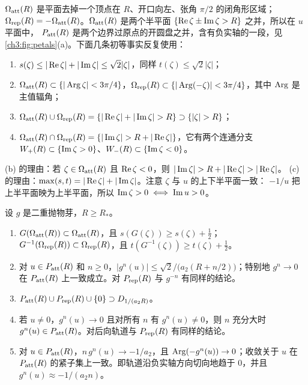 $\Omega_{\mathrm{att}}(R)$ 是平面去掉一个顶点在 $R$、开口向左、张角 $\pi/2$ 的闭角形区域；
$\Omega_{\mathrm{rep}}(R)=-\Omega_{\mathrm{att}}(R)$。$\Omega_{\mathrm{att}}(R)$ 是两个半平面 $\{\operatorname{Re}\zeta\pm\operatorname{Im}\zeta>R\}$ 之并，所以在 $u$ 平面中，
$P_{\mathrm{att}}(R)$ 是两个边界过原点的开圆盘之并，含有负实轴的一段，见\cref{ch3:fig:petals}(a)。下面几条初等事实反复使用：
\begin{enumerate}[label=(\alph*)]
\item $s(\zeta)\le|\operatorname{Re}\zeta|+|\operatorname{Im}\zeta|\le\sqrt2|\zeta|$，同样 $t(\zeta)\le\sqrt2|\zeta|$；
\item $\Omega_{\mathrm{att}}(R)\subset\{|\operatorname{Arg}\zeta|<3\pi/4\}$，$\Omega_{\mathrm{rep}}(R)\subset\{|\operatorname{Arg}(-\zeta)|<3\pi/4\}$，其中 $\operatorname{Arg}$ 是主值辐角；
\item $\Oatt(R)\cup\Orep(R)=\{|\Rea\zeta|+|\Ima\zeta|>R\}\supset\{|\zeta|>R\}$；
\item $\Oatt(R)\cap\Orep(R)=\{|\Ima\zeta|>R+|\Rea\zeta|\}$，它有两个连通分支 $W_+(R)\subset\{\operatorname{Im}\zeta>0\}$、$W_-(R)\subset\{\operatorname{Im}\zeta<0\}$。
\end{enumerate}
(b) 的理由：若 $\zeta\in\Omega_{\mathrm{att}}(R)$ 且 $\operatorname{Re}\zeta<0$，则 $|\Ima\zeta|>R+|\Rea\zeta|>|\Rea\zeta|$。
(c) 的理由：$\max(s,t)=|\operatorname{Re}\zeta|+|\operatorname{Im}\zeta|$。注意 $\zeta$ 与 $u$ 的上下半平面一致：
$-1/u$ 把上半平面映为上半平面，所以 $\operatorname{Im}\zeta>0\iff\operatorname{Im} u>0$。

\begin{theorem}\label{ch3:thm:flower}
设 $g$ 是二重抛物芽，$R\ge R_*$。
\begin{enumerate}
\item $G(\Omega_{\mathrm{att}}(R))\subset\Omega_{\mathrm{att}}(R)$，且 $s(G(\zeta))\ge s(\zeta)+\tfrac12$；
 $G^{-1}(\Omega_{\mathrm{rep}}(R))\subset\Omega_{\mathrm{rep}}(R)$，且 $t(G^{-1}(\zeta))\ge t(\zeta)+\tfrac12$。
\item 对 $u\in P_{\mathrm{att}}(R)$ 和 $n\ge0$，$|g^n(u)|\le\sqrt2/\bigl(a_2(R+n/2)\bigr)$；特别地 $g^n\to0$ 在 $P_{\mathrm{att}}(R)$ 上一致成立。对 $P_{\mathrm{rep}}(R)$ 与 $g^{-n}$ 有同样的结论。
\item $P_{\mathrm{att}}(R)\cup P_{\mathrm{rep}}(R)\cup\{0\}\supset D_{1/(a_2R)}$。
\item 若 $u\ne0$，$g^n(u)\to0$ 且对所有 $n$ 有 $g^n(u)\ne0$，则 $n$ 充分大时 $g^n(u)\in P_{\mathrm{att}}(R)$。对后向轨道与 $P_{\mathrm{rep}}(R)$ 有同样的结论。
\item 对 $u\in P_{\mathrm{att}}(R)$，$n\,g^n(u)\to-1/a_2$，且 $\operatorname{Arg}(-g^n(u))\to0$；收敛关于 $u$ 在 $P_{\mathrm{att}}(R)$ 的紧子集上一致。即轨道沿负实轴方向切向地趋于 $0$，并且 $g^n(u)\approx-1/(a_2n)$。
\end{enumerate}
\end{theorem}

